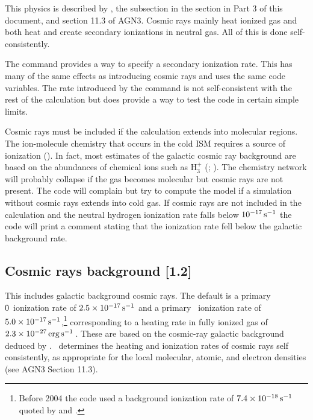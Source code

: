 This physics
is described by \citet{FerlandMushotzky1984},
the subsection  in the section 
 in Part 3 of this
document, and section 11.3 of AGN3.
Cosmic rays mainly heat ionized gas
and both heat and create secondary ionizations in neutral gas.
All of this
is done self-consistently.

The  command provides a way to
specify a secondary ionization rate.
This has many of the same effects
as introducing cosmic rays and uses the same code variables.
The rate
introduced by the  command is not
self-consistent with the rest of the calculation but does
provide a way to test the code in certain simple limits.

Cosmic rays must be included if the calculation extends into molecular
regions.
The ion-molecule chemistry that occurs in the cold ISM requires
a source of ionization (\citealp{Dyson1997}).
In fact, most estimates
of the galactic cosmic ray background are based
on the abundances of chemical
ions such as H$_{3}^{+}$ (\citealp{McCall2003}; \citealp{Shaw2008}).
The chemistry
network will probably collapse if the gas becomes molecular
but cosmic rays
are not present.
The code will complain but try to compute the model if
a simulation without cosmic rays extends into cold gas.
If cosmic rays
are not included in the calculation and the neutral hydrogen ionization
rate falls below $10^{-17} {\rm\thinspace s^{-1}}$
the code will print a comment stating that the
ionization rate fell below the galactic background rate.

\subsection{Cosmic rays background [1.2]}

This includes galactic background cosmic rays.
The default is a primary \h0\
ionization rate of $2.5\times 10^{-17} {\rm\thinspace s^{-1}}$ and a primary \htwo\ ionization
rate of $5.0\times 10^{-17} {\rm\thinspace s^{-1}}$,\footnote{Before 2004 the code used a
background ionization rate of $7.4\times 10^{-18} {\rm\thinspace s^{-1}}$
quoted by \citet[Table 10]{Tielens1985a}
and \citet{McKee1999}.} corresponding to a heating rate in fully ionized gas
of $2.3\times 10^{-27} \mbox{${\rm\thinspace erg}{\rm\thinspace s}^{-1}\,$}$.
These are based on the cosmic-ray galactic background
deduced by \citet{Williams1998}.
\Cloudy\ determines the heating and
ionization rates of cosmic rays self consistently,
as appropriate for the
local molecular, atomic, and electron densities
(see AGN3 Section 11.3).

